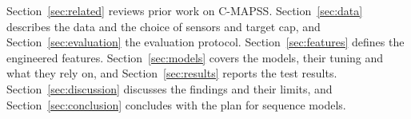 Section~\ref{sec:related} reviews prior work on C-MAPSS.
Section~\ref{sec:data} describes the data and the choice of sensors and
target cap, and Section~\ref{sec:evaluation} the evaluation protocol.
Section~\ref{sec:features} defines the engineered features.
Section~\ref{sec:models} covers the models, their tuning and what they rely
on, and Section~\ref{sec:results} reports the test results.
Section~\ref{sec:discussion} discusses the findings and their limits, and
Section~\ref{sec:conclusion} concludes with the plan for sequence models.
